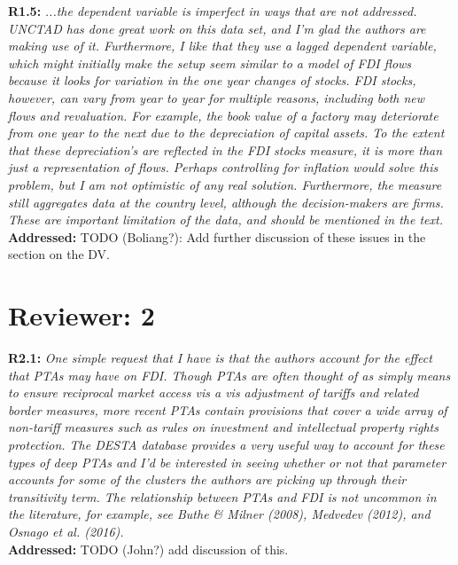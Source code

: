 \documentclass[a4paper,11pt]{texMemo}
\begin{document}
\noindent \textbf{R1.5:} \emph{...the dependent variable is imperfect in ways that are not addressed. UNCTAD has done great work on this data set, and I'm glad the authors are making use of it. Furthermore, I like that they use a lagged dependent variable, which might initially make the setup seem similar to a model of FDI flows because it looks for variation in the one year changes of stocks. FDI stocks, however, can vary from year to year for multiple reasons, including both new flows and revaluation. For example, the book value of a factory may deteriorate from one year to the next due to the depreciation of capital assets. To the extent that these depreciation's are reflected in the FDI stocks measure, it is more than just a representation of flows. Perhaps controlling for inflation would solve this problem, but I am not optimistic of any real solution. Furthermore, the measure still aggregates data at the country level, although the decision-makers are firms. These are important limitation of the data, and should be mentioned in the text.}\\

\noindent \textbf{Addressed:} TODO (Boliang?): Add further discussion of these issues in the section on the DV. \\

\section*{Reviewer: 2}


\noindent \textbf{R2.1:} \emph{One simple request that I have is that the authors account for the effect that PTAs may have on FDI. Though PTAs are often thought of as simply means to ensure reciprocal market access vis a vis adjustment of tariffs and related border measures, more recent PTAs contain provisions that cover a wide array of non-tariff measures such as rules on investment and intellectual property rights protection. The DESTA database provides a very useful way to account for these types of deep PTAs and I'd be interested in seeing whether or not that parameter accounts for some of the clusters the authors are picking up through their transitivity term. The relationship between PTAs and FDI is not uncommon in the literature, for example, see Buthe \& Milner (2008), Medvedev (2012), and Osnago et al. (2016).}\\

\noindent \textbf{Addressed:} TODO (John?) add discussion of this.\\
\end{document}
